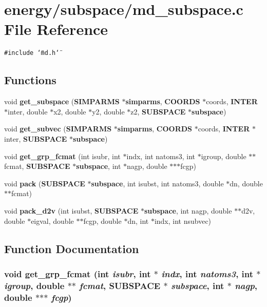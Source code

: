 \section{energy/subspace/md\_\-subspace.c File Reference}
\label{md__subspace_8c}
{\tt \#include \char`\"{}md.h\char`\"{}}\par
\subsection*{Functions}
\begin{CompactItemize}
\item 
void {\bf get\_\-subspace} ({\bf SIMPARMS} $\ast${\bf simparms}, {\bf COORDS} $\ast$coords, {\bf INTER} $\ast$inter, double $\ast$x2, double $\ast$y2, double $\ast$z2, {\bf SUBSPACE} $\ast${\bf subspace})
\item 
void {\bf get\_\-subvec} ({\bf SIMPARMS} $\ast${\bf simparms}, {\bf COORDS} $\ast$coords, {\bf INTER} $\ast$inter, {\bf SUBSPACE} $\ast${\bf subspace})
\item 
void {\bf get\_\-grp\_\-fcmat} (int isubr, int $\ast$indx, int natoms3, int $\ast$igroup, double $\ast$$\ast$fcmat, {\bf SUBSPACE} $\ast${\bf subspace}, int $\ast$nagp, double $\ast$$\ast$$\ast$fcgp)
\item 
void {\bf pack} ({\bf SUBSPACE} $\ast${\bf subspace}, int isubst, int natoms3, double $\ast$dn, double $\ast$$\ast$fcmat)
\item 
void {\bf pack\_\-d2v} (int isubst, {\bf SUBSPACE} $\ast${\bf subspace}, int nagp, double $\ast$$\ast$d2v, double $\ast$eigval, double $\ast$$\ast$fcgp, double $\ast$dn, int $\ast$indx, int nsubvec)
\end{CompactItemize}


\subsection{Function Documentation}
\subsubsection{\setlength{\rightskip}{0pt plus 5cm}void get\_\-grp\_\-fcmat (int {\em isubr}, int $\ast$ {\em indx}, int {\em natoms3}, int $\ast$ {\em igroup}, double $\ast$$\ast$ {\em fcmat}, {\bf SUBSPACE} $\ast$ {\em subspace}, int $\ast$ {\em nagp}, double $\ast$$\ast$$\ast$ {\em fcgp})}\label{md__subspace_8c_b47e1fd3b61cdc5efd75b7f5e5f261aa}


